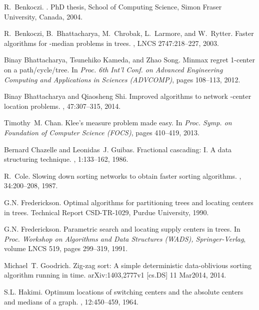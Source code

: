 \documentclass{llncs}
\begin{document}
{\begin{thebibliography}{10}
R.~Benkoczi.
.
\newblock PhD thesis, School of Computing Science, Simon Fraser University,
  Canada, 2004.

R.~Benkoczi, B.~Bhattacharya, M.~Chrobak, L.~Larmore, and W.~Rytter.
\newblock Faster algorithms for -median problems in trees.
,
  LNCS 2747:218--227, 2003.

Binay Bhattacharya, Tsunehiko Kameda, and Zhao Song.
\newblock Minmax regret 1-center on a path/cycle/tree.
\newblock In {\em Proc. 6th Int'l Conf. on Advanced Engineering Computing and
  Applications in Sciences (ADVCOMP)}, pages 108--113, 2012.

Binay Bhattacharya and Qiaosheng Shi.
\newblock Improved algorithms to network -center location problems.
, 47:307--315, 2014.

Timothy~M. Chan.
\newblock Klee's measure problem made easy.
\newblock In {\em Proc. Symp. on Foundation of Computer Science (FOCS)}, pages
  410--419, 2013.

Bernard Chazelle and Leonidas~J. Guibas.
\newblock Fractional cascading: {I. A} data structuring technique.
, 1:133--162, 1986.

R.~Cole.
\newblock Slowing down sorting networks to obtain faster sorting algorithms.
, 34:200--208, 1987.

G.N. Frederickson.
\newblock Optimal algorithms for partitioning trees and locating  centers in
  trees.
\newblock Technical Report CSD-TR-1029, Purdue University, 1990.

G.N. Frederickson.
\newblock Parametric search and locating supply centers in trees.
\newblock In {\em Proc. Workshop on Algorithms and Data Structures (WADS),
  Springer-Verlag}, volume LNCS 519, pages 299--319, 1991.

Michael~T. Goodrich.
\newblock Zig-zag sort: A simple deterministic data-oblivious sorting algorithm
  running in  time.
\newblock arXiv:1403,2777v1 [cs.DS] 11 Mar2014, 2014.

S.L. Hakimi.
\newblock Optimum locations of switching centers and the absolute centers and
  medians of a graph.
, 12:450--459, 1964.


\end{thebibliography}}
\end{document}
